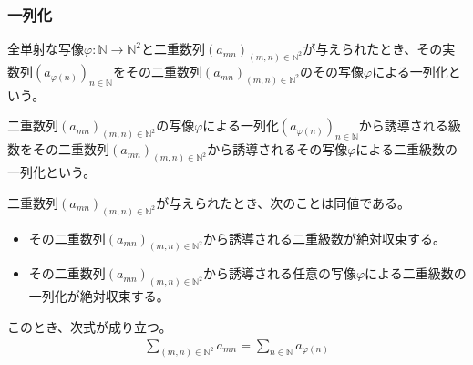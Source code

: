 \documentclass[dvipdfmx]{jsarticle}
\begin{document}
\subsubsection{一列化}%
\begin{dfn}
全単射な写像$\varphi:\mathbb{N} \rightarrow \mathbb{N}^{2}$と二重数列$\left( a_{mn} \right)_{(m,n) \in \mathbb{N}^{2}}$が与えられたとき、その実数列$\left( a_{\varphi(n)} \right)_{n \in \mathbb{N}}$をその二重数列$\left( a_{mn} \right)_{(m,n) \in \mathbb{N}^{2}}$のその写像$\varphi$による一列化という。
\end{dfn}
\begin{dfn}
二重数列$\left( a_{mn} \right)_{(m,n) \in \mathbb{N}^{2}}$の写像$\varphi$による一列化$\left( a_{\varphi(n)} \right)_{n \in \mathbb{N}}$から誘導される級数をその二重数列$\left( a_{mn} \right)_{(m,n) \in \mathbb{N}^{2}}$から誘導されるその写像$\varphi$による二重級数の一列化という。
\end{dfn}
\begin{thm}\label{4.1.9.7}
二重数列$\left( a_{mn} \right)_{(m,n) \in \mathbb{N}^{2}}$が与えられたとき、次のことは同値である。
\begin{itemize}
\item
  その二重数列$\left( a_{mn} \right)_{(m,n) \in \mathbb{N}^{2}}$から誘導される二重級数が絶対収束する。
\item
  その二重数列$\left( a_{mn} \right)_{(m,n) \in \mathbb{N}^{2}}$から誘導される任意の写像$\varphi$による二重級数の一列化が絶対収束する。
\end{itemize}
このとき、次式が成り立つ。
\begin{align*}
\sum_{(m,n) \in \mathbb{N}^{2}}a_{mn} = \sum_{n \in \mathbb{N}}a_{\varphi(n)}
\end{align*}
\end{thm}
\end{document}
